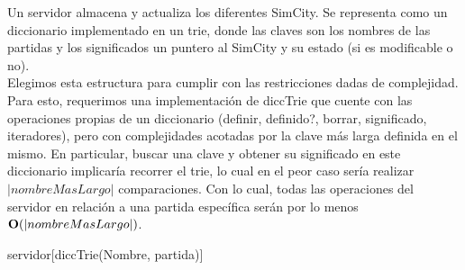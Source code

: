 \begin{Representacion}
  
  
    Un servidor almacena y actualiza los diferentes SimCity. Se representa como un 
    diccionario implementado en un trie, donde las claves son los nombres de las partidas
    y los significados un puntero al SimCity y su estado (si es modificable o no).\\

    Elegimos esta estructura para cumplir con las restricciones dadas de complejidad. Para esto, requerimos una implementación de
    diccTrie que cuente con las operaciones propias de un diccionario (definir, definido?, borrar, significado, iteradores), 
    pero con complejidades acotadas por la clave más larga definida en el mismo. En particular, buscar una clave y obtener su significado 
    en este diccionario implicaría recorrer el trie, lo cual en el peor caso sería realizar $|nombreMasLargo|$ comparaciones. 
    Con lo cual, todas las operaciones del servidor en relación a una partida específica serán por lo menos $\bold{O}(|nombreMasLargo|)$.

    

    \begin{Estructura}{servidor}[diccTrie(Nombre, partida)]
        \begin{Tupla}[partida]
        \end{Tupla}

    \end{Estructura}
    

\end{Representacion}
